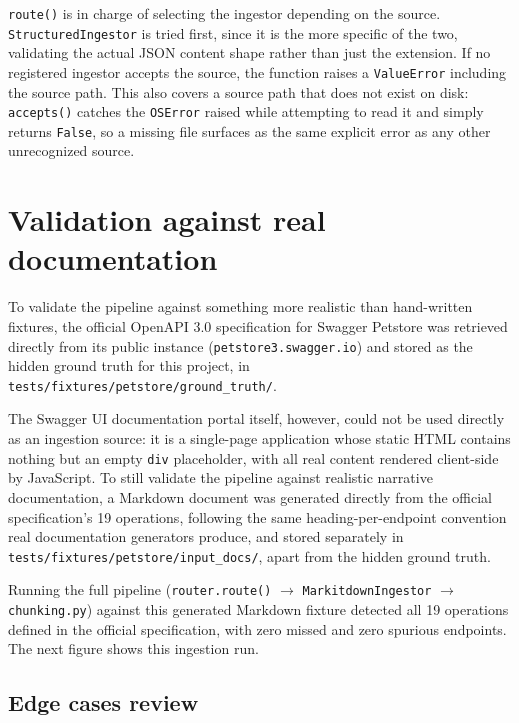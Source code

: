 \texttt{route()} is in charge of selecting the ingestor depending on the
source. \texttt{StructuredIngestor} is tried first, since it is the more
specific of the two, validating the actual JSON content shape rather than
just the extension. If no registered ingestor accepts the source, the
function raises a \texttt{ValueError} including the source path. This also
covers a source path that does not exist on disk: \texttt{accepts()}
catches the \texttt{OSError} raised while attempting to read it and simply
returns \texttt{False}, so a missing file surfaces as the same explicit
error as any other unrecognized source.

\section{Validation against real documentation}

To validate the pipeline against something more realistic than hand-written
fixtures, the official OpenAPI 3.0 specification for Swagger Petstore was
retrieved directly from its public instance
(\texttt{petstore3.swagger.io}) and stored as the hidden ground truth for
this project, in \texttt{tests/fixtures/petstore/ground\_truth/}.

The Swagger UI documentation portal itself, however, could not be used
directly as an ingestion source: it is a single-page application whose
static HTML contains nothing but an empty \texttt{div} placeholder, with
all real content rendered client-side by JavaScript. To still validate the
pipeline against
realistic narrative documentation, a Markdown document was generated
directly from the official specification's 19 operations, following the
same heading-per-endpoint convention real documentation generators
produce, and stored separately in
\texttt{tests/fixtures/petstore/input\_docs/}, apart from the hidden
ground truth.

Running the full pipeline (\texttt{router.route()} $\rightarrow$
\texttt{MarkitdownIngestor} $\rightarrow$ \texttt{chunking.py}) against
this generated Markdown fixture detected all 19 operations defined in the
official specification, with zero missed and zero spurious endpoints. The
next figure shows this ingestion run.


\subsection{Edge cases review}

